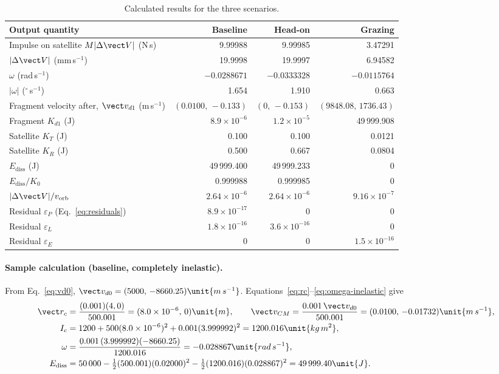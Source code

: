 \begin{table}[H]
  \centering\footnotesize
  \caption{Calculated results for the three scenarios.}
  \label{tab:results}
  \begin{tabular}{@{}lrrr@{}}
    \toprule
    Output quantity & Baseline & Head-on & Grazing \\
    \midrule
    Impulse on satellite $M|\Delta\vect V|$ (N\,s) & 9.99988 & 9.99985 & 3.47291 \\
    $|\Delta\vect V|$ (mm\,s$^{-1}$) & 19.9998 & 19.9997 & 6.94582 \\
    $\omega$ (rad\,s$^{-1}$) & $-0.0288671$ & $-0.0333328$ & $-0.0115764$ \\
    $|\omega|$ ($^\circ$\,s$^{-1}$) & 1.654 & 1.910 & 0.663 \\
    Fragment velocity after, $\vect v_{d1}$ (m\,s$^{-1}$) & $(0.0100,\,-0.133)$ & $(0,\,-0.153)$ & $(9848.08,\,1736.43)$ \\
    Fragment $K_{d1}$ (J) & $8.9\times10^{-6}$ & $1.2\times10^{-5}$ & 49\,999.908 \\
    Satellite $K_T$ (J) & 0.100 & 0.100 & 0.0121 \\
    Satellite $K_R$ (J) & 0.500 & 0.667 & 0.0804 \\
    $E_{\mathrm{diss}}$ (J) & 49\,999.400 & 49\,999.233 & 0 \\
    $E_{\mathrm{diss}}/K_0$ & 0.999988 & 0.999985 & 0 \\
    $|\Delta\vect V|/v_{\mathrm{orb}}$ & $2.64\times10^{-6}$ & $2.64\times10^{-6}$ & $9.16\times10^{-7}$ \\
    \midrule
    Residual $\varepsilon_P$ (Eq.~\eqref{eq:residuals}) & $8.9\times10^{-17}$ & 0 & 0 \\
    Residual $\varepsilon_L$ & $1.8\times10^{-16}$ & $3.6\times10^{-16}$ & 0 \\
    Residual $\varepsilon_E$ & 0 & 0 & $1.5\times10^{-16}$ \\
    \bottomrule
  \end{tabular}
\end{table}


\paragraph{Sample calculation (baseline, completely inelastic).}
From Eq.~\eqref{eq:vd0}, $\vect v_{d0}=(5000,\,-8660.25)\unit{m\,s^{-1}}$.
Equations~\eqref{eq:rc}--\eqref{eq:omega-inelastic} give
\begin{equation}
  \begin{aligned}
    \vect r_c &= \frac{(0.001)(4,0)}{500.001}=(8.0\times10^{-6},\,0)\unit{m},\qquad
    \vect v_{CM} = \frac{0.001\,\vect v_{d0}}{500.001}=(0.0100,\,-0.01732)\unit{m\,s^{-1}},\\
    I_c &= 1200 + 500(8.0\times10^{-6})^2 + 0.001(3.999992)^2 = 1200.016\unit{kg\,m^2},\\
    \omega &= \frac{0.001\,(3.999992)(-8660.25)}{1200.016} = -0.028867\unit{rad\,s^{-1}},\\
    E_{\mathrm{diss}} &= 50\,000 - \tfrac12(500.001)(0.02000)^2 - \tfrac12(1200.016)(0.028867)^2
      = 49\,999.40\unit{J}.
  \end{aligned}
  \label{eq:sample-inelastic}
\end{equation}
